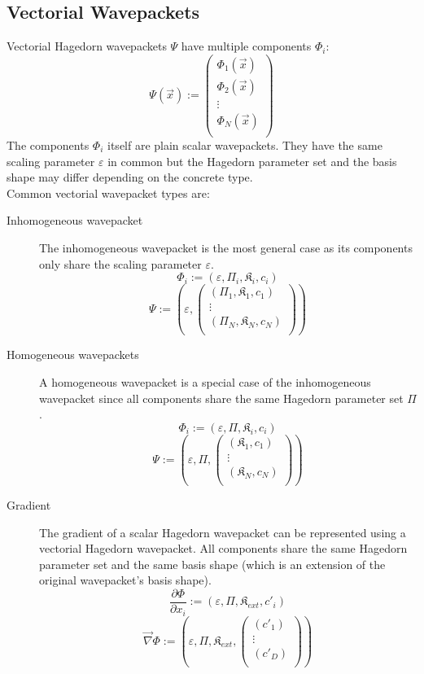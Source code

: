 \documentclass{article}
\begin{document}
\subsection{Vectorial Wavepackets}
Vectorial Hagedorn wavepackets \(\Psi\) have multiple components \(\Phi_i\):
\[
  \Psi(\vec{x}) :=
  \begin{pmatrix}
    \Phi_1(\vec{x}) \\
    \Phi_2(\vec{x}) \\
    \vdots \\
    \Phi_N(\vec{x}) \\
  \end{pmatrix}
\]
The components \(\Phi_i\) itself are plain scalar wavepackets.
They have the same scaling parameter \(\varepsilon\) in common but
the Hagedorn parameter set and the basis shape may differ depending on
the concrete type. \\
Common vectorial wavepacket types are:
\begin{description}
\item[Inhomogeneous wavepacket]
  The inhomogeneous wavepacket is the most general case as its components only share
  the scaling parameter \(\varepsilon\).
  \[
    \Phi_i := (\varepsilon, \Pi_i, \mathfrak{K}_i, c_i) \] \[
    \Psi := \left(\varepsilon, 
    \begin{pmatrix}
      (\Pi_1, \mathfrak{K}_1, c_1) \\
      \vdots \\
      (\Pi_N, \mathfrak{K}_N, c_N) \\
    \end{pmatrix}\right)
  \]
\item[Homogeneous wavepackets]
  A homogeneous wavepacket is a special case of the inhomogeneous wavepacket
  since all components share the same Hagedorn parameter set \(\Pi\).
  \[
    \Phi_i := (\varepsilon, \Pi, \mathfrak{K}_i, c_i) \] \[
    \Psi := \left(\varepsilon, \Pi,
    \begin{pmatrix}
      (\mathfrak{K}_1, c_1) \\
      \vdots \\
      (\mathfrak{K}_N, c_N) \\
    \end{pmatrix}\right)
  \]
\item[Gradient]
  The gradient of a scalar Hagedorn wavepacket can be represented using a vectorial Hagedorn
  wavepacket. All components share the same Hagedorn parameter set and the
  same basis shape (which is an extension of the original wavepacket's basis shape).
  \[
    \frac{\partial \Phi}{\partial x_i} := (\varepsilon, \Pi, \mathfrak{K}_{ext}, c'_i) \] \[
    \vec{\nabla} \Phi := \left(\varepsilon, \Pi, \mathfrak{K}_{ext},
    \begin{pmatrix}
      (c'_1) \\
      \vdots \\
      (c'_D) \\
    \end{pmatrix}\right)
  \]
\end{description}
\end{document}
